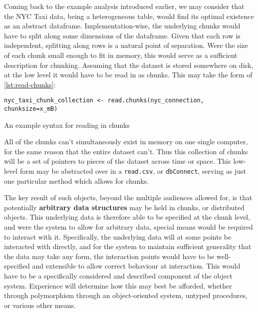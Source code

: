 Coming back to the example analysis introduced earlier, we may consider
that the NYC Taxi data, being a heterogeneous table, would find its
optimal existence as an abstract dataframe. Implementation-wise, the
underlying chunks would have to split along some dimensions of the
dataframe. Given that each row is independent, splitting along rows is a
natural point of separation. Were the size of each chunk small enough to
fit in memory, this would serve as a sufficient description for
chunking. Assuming that the dataset is stored somewhere on disk, at the
low level it would have to be read in as chunks. This may take the form of
\ref{lst:read-chunks}:

\begin{listing}
    \begin{verbatim}
nyc_taxi_chunk_collection <- read.chunks(nyc_connection, chunksize=x_mB)
    \end{verbatim}
    \caption{An example syntax for reading in chunks}
    \label{lst:read-chunks}
\end{listing}

All of the chunks can't simultaneously exist in memory on one single
computer, for the same reason that the entire dataset can't. Thus this
collection of chunks will be a set of pointers to pieces of the dataset
across time or space. This low-level form may be abstracted over in a
\texttt{read.csv}, or \texttt{dbConnect}, serving as just one particular
method which allows for chunks.

The key result of such objects, beyond the multiple audiences allowed
for, is that potentially \textbf{arbitrary data structures} may be held
in chunks, or distributed objects. This underlying data is therefore
able to be specified at the chunk level, and were the system to allow
for arbitrary data, special means would be required to interact with it.
Specifically, the underlying data will at some points be interacted with
directly, and for the system to maintain sufficient generality that the
data may take any form, the interaction points would have to be
well-specified and extensible to allow correct behaviour at interaction.
This would have to be a specifically considered and described component
of the object system. Experience will determine how this may best be
afforded, whether through polymorphism through an object-oriented
system, untyped procedures, or various other means.

